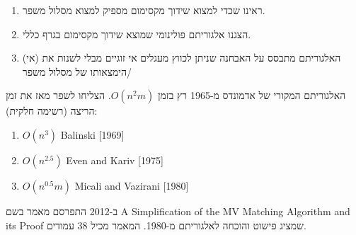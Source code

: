 \begin{enumerate}
\item
ראינו שכדי למצוא שידוך מקסימום מספיק למצוא מסלול משפר.
\item
הצגנו אלגוריתם פולינומי שמוצא שידוך מקסימום בגרף כללי. 
\item
האלגוריתם מתבסס על האבחנה שניתן לכווץ מעגלים אי זוגיים מבלי לשנות את 
(אי) הימצאותו של מסלול משפר/
\end{enumerate}

האלגוריתם המקורי של אדמונדס מ-1965 רץ בזמן 
$O(n^2m)$.
הצליחו לשפר מאז את זמן הריצה (רשימה חלקית):
\begin{enumerate}
\item $O(n^3)$ Balinski [1969]
\item $O(n^{2.5})$ Even and Kariv [1975]
\item $O(n^{0.5} m)$ Micali and Vazirani [1980]
\end{enumerate}

ב-2012 התפרסם מאמר בשם 
\textenglish{A Simplification of the MV Matching Algorithm and its Proof}
שמציג פישוט והוכחה לאלגוריתם מ-1980. המאמר מכיל 38 עמודים.
